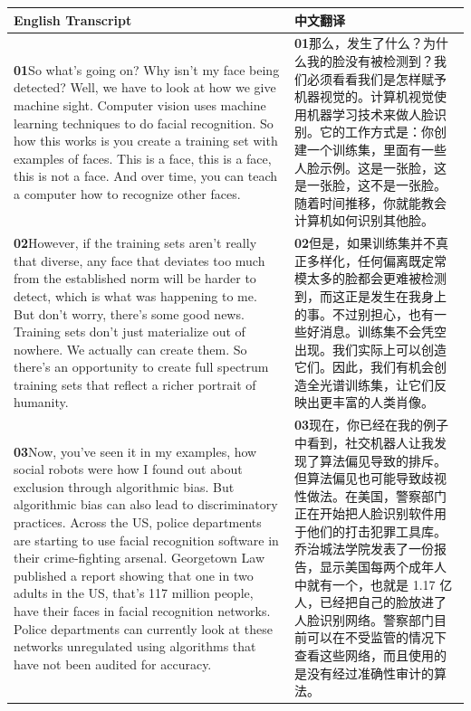 \documentclass[UTF8,zihao=-4,fontset=fandol]{ctexart}
\newcommand{\TranscriptColumn}{\raggedright\arraybackslash\hyphenpenalty=10000\exhyphenpenalty=10000\sloppy}
\begin{document}
\renewcommand{\arraystretch}{1.23}
\begin{longtable}{>{\TranscriptColumn}p{} >{\TranscriptColumn}p{}}
\rowcolor{headerBg}\textbf{English Transcript} & \textbf{中文翻译} \\ \hline
\textbf{01}\quad So what's going on? Why isn't my face being detected? Well, we have to look at how we give machine sight. Computer vision uses machine learning techniques to do facial recognition. So how this works is you create a training set with examples of faces. This is a face, this is a face, this is not a face. And over time, you can teach a computer how to recognize other faces. & \textbf{01}\quad 那么，发生了什么？为什么我的脸没有被检测到？我们必须看看我们是怎样赋予机器视觉的。计算机视觉使用机器学习技术来做人脸识别。它的工作方式是：你创建一个训练集，里面有一些人脸示例。这是一张脸，这是一张脸，这不是一张脸。随着时间推移，你就能教会计算机如何识别其他脸。 \\ \hline
\textbf{02}\quad However, if the training sets aren't really that diverse, any face that deviates too much from the established norm will be harder to detect, which is what was happening to me. But don't worry, there's some good news. Training sets don't just materialize out of nowhere. We actually can create them. So there's an opportunity to create full spectrum training sets that reflect a richer portrait of humanity. & \textbf{02}\quad 但是，如果训练集并不真正多样化，任何偏离既定常模太多的脸都会更难被检测到，而这正是发生在我身上的事。不过别担心，也有一些好消息。训练集不会凭空出现。我们实际上可以创造它们。因此，我们有机会创造全光谱训练集，让它们反映出更丰富的人类肖像。 \\ \hline
\textbf{03}\quad Now, you've seen it in my examples, how social robots were how I found out about exclusion through algorithmic bias. But algorithmic bias can also lead to discriminatory practices. Across the US, police departments are starting to use facial recognition software in their crime-fighting arsenal. Georgetown Law published a report showing that one in two adults in the US, that's 117 million people, have their faces in facial recognition networks. Police departments can currently look at these networks unregulated using algorithms that have not been audited for accuracy. & \textbf{03}\quad 现在，你已经在我的例子中看到，社交机器人让我发现了算法偏见导致的排斥。但算法偏见也可能导致歧视性做法。在美国，警察部门正在开始把人脸识别软件用于他们的打击犯罪工具库。乔治城法学院发表了一份报告，显示美国每两个成年人中就有一个，也就是 1.17 亿人，已经把自己的脸放进了人脸识别网络。警察部门目前可以在不受监管的情况下查看这些网络，而且使用的是没有经过准确性审计的算法。 \\ \hline

\end{longtable}
\end{document}
